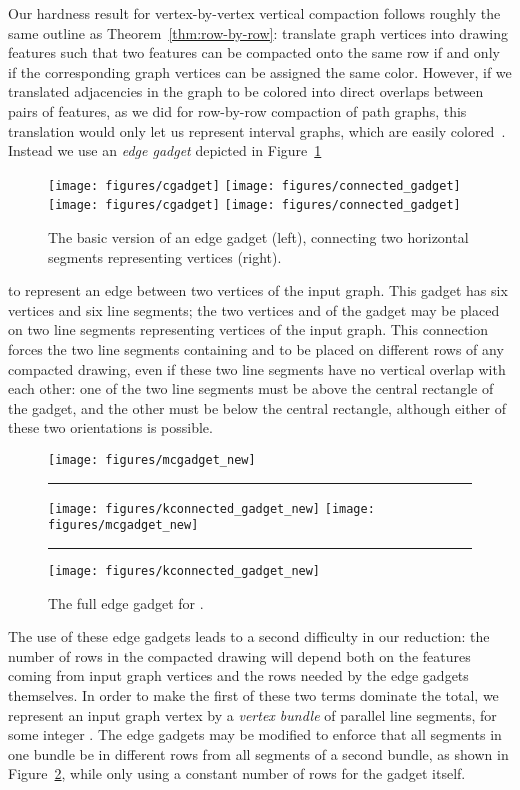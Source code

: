 \documentclass[12pt]{article}
\theoremstyle{definitions}
\begin{document}
Our hardness result for vertex-by-vertex vertical compaction follows roughly the same outline as Theorem~\ref{thm:row-by-row}: translate graph vertices into drawing features such that two features  can be compacted onto the same row if and only if the corresponding graph vertices can be assigned the same color. However, if we translated adjacencies in the graph to be colored into direct overlaps between pairs of features, as we did for row-by-row compaction of path graphs, this translation would only let us represent interval graphs, which are easily colored~\cite{Olariu:1991}. Instead we use an \emph{edge gadget} depicted in Figure~\ref{fig:edge-gadget}
\begin{figure}[b]
\centering
\ifFull
\texttt{[image: figures/cgadget]}\qquad
\texttt{[image: figures/connected\_gadget]}
\else
\texttt{[image: figures/cgadget]}\qquad
\texttt{[image: figures/connected\_gadget]}
\fi
\caption{The basic version of an edge gadget (left), connecting two horizontal segments representing vertices (right).}
\label{fig:edge-gadget}
\end{figure}
to represent an edge between two vertices of the
input graph. This gadget has six vertices and six line segments; the two vertices  and  of the gadget may be placed on two line segments representing vertices of the input graph. This connection forces the two line segments containing  and  to be placed on different rows of any compacted drawing, even if these two line segments have no vertical overlap with each other: one of the two line segments must be above the central rectangle of the gadget, and the other must be below the central rectangle, although either of these two orientations is possible.

\begin{figure}[b]
\centering
\ifFull
\texttt{[image: figures/mcgadget\_new]}\rule{2em}{0em}
\texttt{[image: figures/kconnected\_gadget\_new]}
\else
\texttt{[image: figures/mcgadget\_new]}\rule{2em}{0em}
\texttt{[image: figures/kconnected\_gadget\_new]}
\fi
\caption{The full edge gadget for .}
\label{fig:bundle-gadget}
\end{figure}

The use of these edge gadgets leads to a second difficulty in our reduction: the number of rows in the compacted drawing will depend both on the features coming from input graph vertices and the rows needed by the edge gadgets themselves. In order to make the first of these two terms dominate the total, we represent an input graph vertex by a \emph{vertex bundle} of  parallel line segments, for some integer . The edge gadgets may be modified to enforce that all segments in one bundle be in different rows from all segments of a second bundle, as shown in Figure~\ref{fig:bundle-gadget}, while only using a constant number of rows for the gadget itself.
\end{document}

